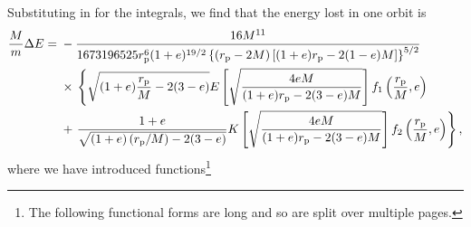 Substituting in for the integrals, we find that the energy lost in one orbit is
\begin{align}
\frac{M}{m} \Delta E = {} & -\frac{16 M^{11}}{1673196525 r_\mathrm{p}^{6} (1 + e)^{{19}/{2}} \left\{\left(r_\mathrm{p} - 2 M\right)\left[(1 + e)r_\mathrm{p} - 2(1 - e)M\right]\right\}^{{5}/{2}}} \nonumber \\
 {} & \times {} \left\{\sqrt{( 1+ e)\frac{r_\mathrm{p}}{M} - 2(3 - e)} E\left[\sqrt{\frac{4 e M}{(1+e) r_\mathrm{p} - 2(3 - e)M}}\right] f_{1}\left(\frac{r_\mathrm{p}}{M}, e\right) \right. \nonumber \\
   {} & + \left. \frac{1 + e}{\sqrt{(1 + e)\left(r_\mathrm{p}/M\right)- 2 (3 - e)}} K\left[\sqrt{\frac{4 e M}{(1+e) r_\mathrm{p} - 2(3 - e)M}}\right] f_{2} \left(\frac{r_\mathrm{p}}{M}, e\right)\right\},
\end{align}
where we have introduced functions\footnote{The following functional forms are long and so are split over multiple pages.}
